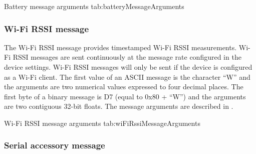 \begingroup
    \def\tempArgumentA{Battery percentage}
    \def\tempArgumentB{Battery voltage in volts}
    \def\tempArgumentC{Charger connected (0 = not connected, 1 = connected)}
    \def\tempArgumentD{Charger status (0 = not charging, 1 = charging)}
    \dataMessageTable
    {Battery message arguments}
    {tab:batteryMessageArguments}
\endgroup

\begingroup
    \def\tempNameA{Percentage}
    \def\tempNameB{Voltage}
    \def\tempNameC{Charger connected}
    \def\tempNameD{Charger status}
    \def\tempValueA{100}
    \def\tempValueB{4.2}
    \def\tempValueC{1}
    \def\tempValueD{0}
    \def\tempAsciiFirst{B}
    \def\tempAsciiA{100.0000}
    \def\tempAsciiB{4.2000}
    \def\tempAsciiC{1.0000}
    \def\tempAsciiD{0.0000}
    \def\tempBinaryFirst{C2}
    \def\tempBinaryA{00 00 C8 42}
    \def\tempBinaryB{66 66 86 40}
    \def\tempBinaryC{00 00 80 3F}
    \def\tempBinaryD{00 00 00 00}
    \dataMessageExample
\endgroup

\subsubsection{Wi-Fi \acs{RSSI} message}

The Wi-Fi \ac{RSSI} message provides timestamped Wi-Fi \ac{RSSI} measurements.  Wi-Fi \ac{RSSI} messages are sent continuously at the message rate configured in the device settings.  Wi-Fi \ac{RSSI} messages will only be sent if the device is configured as a Wi-Fi client.  The first value of an \ac{ASCII} message is the character \enquote{W} and the arguments are two numerical values expressed to four decimal places.  The first byte of a binary message is D7 (equal to 0x80 + \enquote{W}) and the arguments are two contiguous 32-bit floats.  The message arguments are described in .

\begingroup
    \def\tempArgumentA{\acs{RSSI} percentage}
    \def\tempArgumentB{\acs{RSSI} power in dBm}
    \dataMessageTable
    {Wi-Fi \acs{RSSI} message arguments}
    {tab:wiFiRssiMessageArguments}
\endgroup

\begingroup
    \def\tempNameA{\acs{RSSI} percentage}
    \def\tempNameB{\acs{RSSI} power}
    \def\tempValueA{100.0}
    \def\tempValueB{-50.0}
    \def\tempAsciiFirst{W}
    \def\tempAsciiA{100.000}
    \def\tempAsciiB{-50.0000}
    \def\tempBinaryFirst{D7}
    \def\tempBinaryA{00 00 C8 42}
    \def\tempBinaryB{00 00 48 C2}
    \dataMessageExample
\endgroup

\subsubsection{Serial accessory message}


